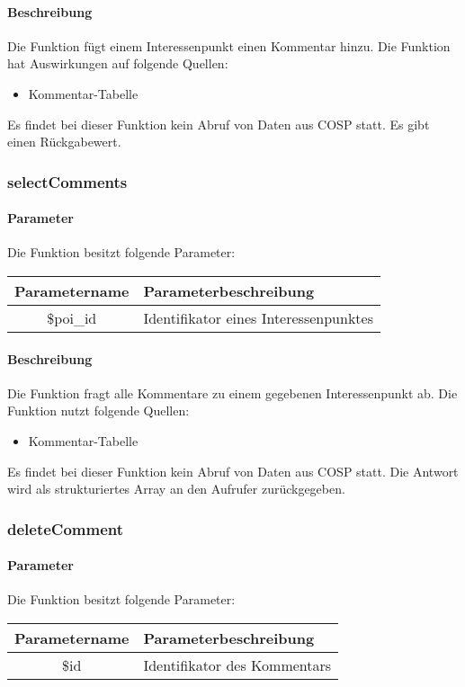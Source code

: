 \paragraph{Beschreibung} Die Funktion fügt einem Interessenpunkt einen Kommentar hinzu. Die Funktion hat Auswirkungen auf folgende Quellen:
\begin{itemize}
	\item Kommentar-Tabelle
\end{itemize}
Es findet bei dieser Funktion kein Abruf von Daten aus {\glqq COSP\grqq} statt. Es gibt einen Rückgabewert.
\subsubsection{selectComments}
\paragraph{Parameter} Die Funktion besitzt folgende Parameter:
\begin{table}[H]
	\begin{tabular}{|c|p{11cm}|}
		\hline
		\textbf{Parametername} & \textbf{Parameterbeschreibung} \\ \hline
		\$poi\_id & Identifikator eines Interessenpunktes \\ \hline
	\end{tabular}
\end{table}
\paragraph{Beschreibung} Die Funktion fragt alle Kommentare zu einem gegebenen Interessenpunkt ab. Die Funktion nutzt folgende Quellen:
\begin{itemize}
	\item Kommentar-Tabelle
\end{itemize}
Es findet bei dieser Funktion kein Abruf von Daten aus {\glqq COSP\grqq} statt. Die Antwort wird als strukturiertes Array an den Aufrufer zurückgegeben.
\subsubsection{deleteComment}
\paragraph{Parameter} Die Funktion besitzt folgende Parameter:
\begin{table}[H]
	\begin{tabular}{|c|p{11cm}|}
		\hline
		\textbf{Parametername} & \textbf{Parameterbeschreibung} \\ \hline
		\$id & Identifikator des Kommentars \\ \hline
	\end{tabular}
\end{table}
